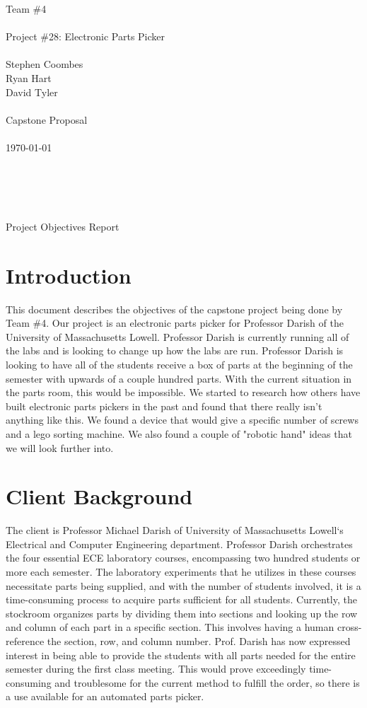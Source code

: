 \documentclass[12pt]{report}
\begin{document}
\noindent Team \#4 \\  \\
Project \#28: Electronic Parts Picker \\ \\
Stephen Coombes \\
Ryan Hart \\
David Tyler \\ \\
Capstone Proposal \\ \\
\today \\ \\ \\ \\ \\
\centerline{Project Objectives Report}
\newpage

\section*{Introduction}

This document describes the objectives of the capstone project being done by Team \#4. Our project is an electronic parts picker for Professor Darish of the University of Massachusetts Lowell. Professor Darish is currently running all of the labs and is looking to change up how the labs are run. Professor Darish is looking to have all of the students receive a box of parts at the beginning of the semester with upwards of a couple hundred parts. With the current situation in the parts room, this would be impossible. We started to research how others have built electronic parts pickers in the past and found that there really isn't anything like this. We found a device that would give a specific number of screws and a lego sorting machine. We also found a couple of "robotic hand" ideas that we will look further into. 


\section*{Client Background}

The client is Professor Michael Darish of University of Massachusetts Lowell`s Electrical and Computer Engineering department.  Professor Darish orchestrates the four essential ECE laboratory courses, encompassing two hundred students or more each semester.  The laboratory experiments that he utilizes in these courses necessitate parts being supplied, and with the number of students involved, it is a time-consuming process to acquire parts sufficient for all students.  Currently, the stockroom organizes parts by dividing them into sections and looking up the row and column of each part in a specific section. This involves having a human cross-reference the section, row, and column number. Prof. Darish has now expressed interest in being able to provide the students with all parts needed for the entire semester during the first class meeting.  This would prove exceedingly time-consuming and troublesome for the current method to fulfill the order, so there is a use available for an automated parts picker.  
\end{document}
